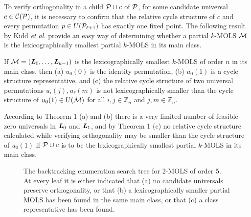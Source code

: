 To verify orthogonality in a child $ \mathcal{P} \cup c$ of $\mathcal{P}$, for some candidate universal $c \in \mathcal{C}(\mathcal{P})$, it is necessary to confirm that the relative cycle structure of  $c$ and every permutation $p\in  U(\mathcal{P}_{\ell+1})$ has exactly one fixed point. The following result by Kidd \emph{et al.} \cite[Theorem 4.3.2]{Kidd2012} provide an easy way of determining whether a partial $k$-MOLS  $\mathcal{ M}$ is the lexicographically smallest partial $k$-MOLS in its main class.
\begin{theorem}{\cite[Theorem 4.3.2]{Kidd2012} }
If $\mathcal{ M}= (\mbox{\bf \emph{L}}_0,     \ldots, \mbox{\bf \emph{L}}_{k-1})$ is the lexicographically smallest $k$-MOLS of order $n$ in its main class, then (a) $u_0{(0)}$ is the identity permutation, (b) $u_0{(1)}$ is a cycle structure representative, and (c) the relative cycle structure of two universal permutations $u_i{(j)}, u_{\ell}{(m)}$ is not {lexicographically} smaller than the cycle structure of $u_0{(1)}\in U(\mathcal{ M})$ for all $i, j \in \mathbb{Z}_n$ and $j, m\in \mathbb{Z}_n$.
\end{theorem}
According to Theorem 1 (a) and (b) there is a very limited number of feasible zero universals in $\mbox{\bf \emph{L}}_0$ and $\mbox{\bf \emph{L}}_1$, and by Theorem 1 (c) no  relative cycle structure calculated while verifying orthogonality may be smaller than the cycle structure of $u_0{(1)}$ if $\mathcal{P} \cup c$ is to be the lexicographically smallest partial $k$-MOLS in its main class.
 
 \begin{figure}[b!]
 \centering 
  \begin{sideways}     
            
  \end{sideways}
  
  \vspace*{.4cm} \caption{The backtracking enumeration search tree for 2-MOLS of order 5. At every leaf it is either indicated that (a) no candidate universals preserve orthogonality, or that (b) a lexicographically smaller partial MOLS has been found in the same main class, or  that (c) a class representative has been found.}\label{figtree}
\end{figure}

